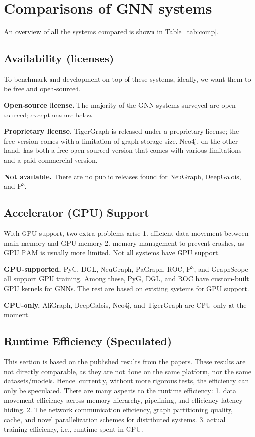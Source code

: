 \vspace{-2mm}
\section{Comparisons of GNN systems}
An overview of all the systems compared is shown in Table~\ref{tab:comp}.
\label{sec:comp}
\subsection{Availability (licenses)}
To benchmark and development on top of these systems, ideally, we want them to be free and open-sourced.


\vspace{2mm}
\noindent \textbf{Open-source license.}
The majority of the GNN systems surveyed are open-sourced; exceptions are below.


\vspace{2mm}
\noindent \textbf{Proprietary license.}
TigerGraph is released under a proprietary license; the free version comes with a limitation of graph storage size. Neo4j, on the other hand, has both a free open-sourced version that comes with various limitations and a paid commercial version.

\vspace{2mm}
\noindent \textbf{Not available.}
There are no public releases found for NeuGraph, DeepGalois, and P$^3$.




\subsection{Accelerator (GPU) Support}
With GPU support, two extra problems arise 1. efficient data movement between main memory and GPU memory 2. memory management to prevent crashes, as GPU RAM is usually more limited. Not all systems have GPU support.

\vspace{2mm}
\noindent \textbf{GPU-supported.} PyG, DGL, NeuGraph, PaGraph, ROC, P$^{3}$, and GraphScope all support GPU training. Among these, PyG, DGL, and ROC have custom-built GPU kernels for GNNs. The rest are based on existing systems for GPU support.

\vspace{2mm}
\noindent \textbf{CPU-only.} AliGraph, DeepGalois, Neo4j, and TigerGraph are CPU-only at the moment.

\subsection{Runtime Efficiency (Speculated)}
This section is based on the published results from the papers. These results are not directly comparable, as they are not done on the same platform, nor the same datasets/models. Hence, currently, without more rigorous tests, the efficiency can only be speculated. There are many aspects to the runtime efficiency: 1. data movement efficiency across memory hierarchy, pipelining, and efficiency latency hiding. 2. The network communication efficiency, graph partitioning quality, cache, and novel parallelization schemes for distributed systems. 3. actual training efficiency, i.e., runtime spent in GPU. 


